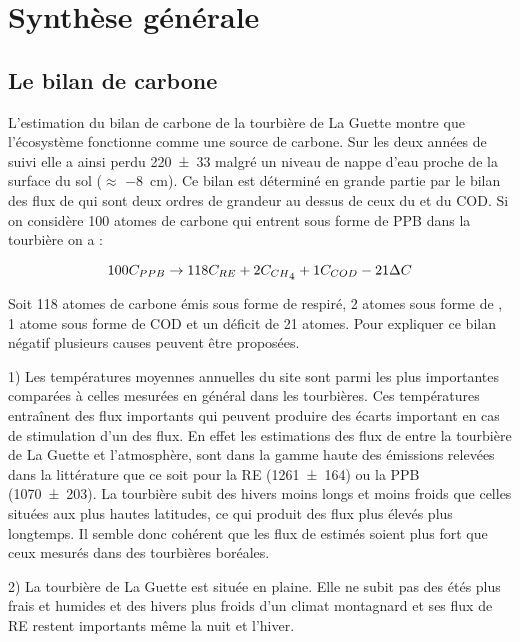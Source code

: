 \section*{Synthèse générale}


\subsection*{Le bilan de carbone}

L'estimation du bilan de carbone de la tourbière de La Guette montre que l'écosystème fonctionne comme une source de carbone.
Sur les deux années de suivi elle a ainsi perdu \SI{220(33)}{\gcma} malgré un niveau de nappe d'eau proche de la surface du sol ($\approx$ \SI{-8}{\centi\metre}).
Ce bilan est déterminé en grande partie par le bilan des flux de \coo qui sont deux ordres de grandeur au dessus de ceux du \chh et du COD.
Si on considère 100 atomes de carbone qui entrent sous forme de PPB dans la tourbière on a :

\begin{equation}
100C_{PPB} \rightarrow 118C_{RE} + 2C_{CH\textsubscript{4}} + 1C_{COD} -21\Delta C
\end{equation}

Soit 118 atomes de carbone émis sous forme de \coo respiré, 2 atomes sous forme de \chh, 1 atome sous forme de COD et un déficit de 21 atomes.
Pour expliquer ce bilan négatif plusieurs causes peuvent être proposées.

1) Les températures moyennes annuelles du site sont parmi les plus importantes comparées à celles mesurées en général dans les tourbières.
Ces températures entraînent des flux importants qui peuvent produire des écarts important en cas de stimulation d'un des flux.
En effet les estimations des flux de \coo entre la tourbière de La Guette et l'atmosphère, sont dans la gamme haute des émissions relevées dans la littérature que ce soit pour la RE (\SI{1261(164)}{\gcma}) ou la PPB (\SI{1070(203)}{\gcma}).
La tourbière subit des hivers moins longs et moins froids que celles situées aux plus hautes latitudes, ce qui produit des flux plus élevés plus longtemps.
Il semble donc cohérent que les flux de \coo estimés soient plus fort que ceux mesurés dans des tourbières boréales.

2) La tourbière de La Guette est située en plaine. 
Elle ne subit pas des étés plus frais et humides et des hivers plus froids d'un climat montagnard et ses flux de RE restent importants même la nuit et l'hiver.

